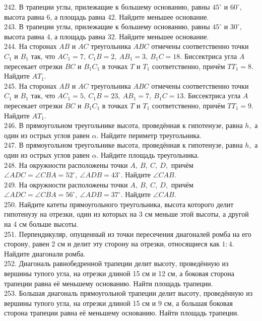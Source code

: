 242. В трапеции углы, прилежащие к большему основанию, равны $45^\circ$ и $60^\circ,$ высота равна 6, а площадь равна 42. Найдите меньшее основание.\\
243. В трапеции углы, прилежащие к большему основанию, равны $45^\circ$ и $30^\circ,$ высота равна 4, а площадь равна 32. Найдите меньшее основание.\\
244. На сторонах $AB$ и $AC$ треугольника $ABC$ отмечены соответственно точки $C_1$ и $B_1$ так, что $AC_1=7,\
C_1B=2,\ AB_1=3,\ B_1C=18.$ Биссектриса угла $A$ пересекает отрезки $BC$ и $B_1C_1$ в точках $T$ и $T_1$ соответственно, причём
$TT_1=8.$ Найдите $AT_1.$\\
245. На сторонах $AB$ и $AC$ треугольника $ABC$ отмечены соответственно точки $C_1$ и $B_1$ так, что $AC_1=5,\
C_1B=23,\ AB_1=7,\ B_1C=13.$ Биссектриса угла $A$ пересекает отрезки $BC$ и $B_1C_1$ в точках $T$ и $T_1$ соответственно, причём
$TT_1=9.$ Найдите $AT_1.$\\
246. В прямоугольном треугольнике высота, проведённая к гипотенузе, равна $h,$ а один из острых
углов равен $\alpha.$ Найдите периметр треугольника.\\
247. В прямоугольном треугольнике высота, проведённая к гипотенузе, равна $h,$ а один из острых
углов равен $\alpha.$ Найдите площадь треугольника.\\
248. На окружности расположены точки $A,\ B,\ C,\ D,$ причём $\angle ADC=\angle CBA=52^\circ,\
\angle ADB=43^\circ.$ Найдите $\angle CAB.$\\
249. На окружности расположены точки $A,\ B,\ C,\ D,$ причём $\angle ADC=\angle CBA=56^\circ,\
\angle ADB=37^\circ.$ Найдите $\angle CAB.$\\
250. Найдите катеты прямоугольного треугольника, высота
которого делит гипотенузу на отрезки, один из которых
на 3 см меньше этой высоты, а другой на 4 см больше
высоты.\\
251. Перпендикуляр, опущенный из точки пересечения
диагоналей ромба на его сторону, равен 2 см и делит эту
сторону на отрезки, относящиеся как $1:4.$ Найдите
диагонали ромба.\\
252. Диагональ равнобедренной трапеции делит высоту,
проведённую из вершины тупого угла, на отрезки длиной
15 см и 12 см, а боковая сторона трапеции равна её
меньшему основанию. Найти площадь трапеции.\\
253. Большая диагональ прямоугольной трапеции делит
высоту, проведённую из вершины тупого угла, на отрезки
длиной 15 см и 9 см, а большая боковая сторона трапеции
равна её меньшему основанию. Найти площадь
трапеции.
\newpage

